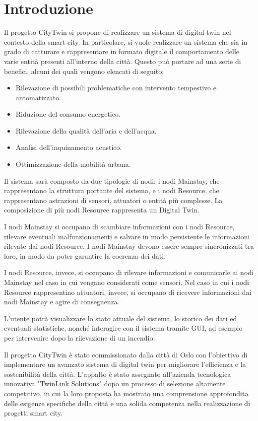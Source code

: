 \chapter{Introduzione}
Il progetto CityTwin si propone di realizzare un sistema di digital twin nel contesto della smart city. In particolare, si vuole realizzare un sistema che sia in grado di catturare e rappresentare in formato digitale il comportamento delle varie entità presenti all'interno della città. Questo può portare ad una serie di benefici, alcuni dei quali vengono elencati di seguito:

\begin{itemize}
    \item Rilevazione di possibili problematiche con intervento tempestivo e automatizzato.
    \item Riduzione del consumo energetico.
    \item Rilevazione della qualità dell'aria e dell'acqua.
    \item Analisi dell'inquinamento acustico.
    \item Ottimizzazione della mobilità urbana.
\end{itemize}

Il sistema sarà composto da due tipologie di nodi: i nodi Mainstay, che rappresentano la struttura portante del sistema, e i nodi Resource, che rappresentano astrazioni di sensori, attuatori o entità più complesse. La composizione di più nodi Resource rappresenta un Digital Twin.

I nodi Mainstay si occupano di scambiare informazioni con i nodi Resource, rilevare eventuali malfunzionamenti e salvare in modo persistente le informazioni rilevate dai nodi Resource. I nodi Mainstay devono essere sempre sincronizzati tra loro, in modo da poter garantire la coerenza dei dati.

I nodi Resource, invece, si occupano di rilevare informazioni e comunicarle ai nodi Mainstay nel caso in cui vengano considerati come sensori. Nel caso in cui i nodi Resource rappresentino attuatori, invece, si occupano di ricevere informazioni dai nodi Mainstay e agire di conseguenza.

L'utente potrà visualizzare lo stato attuale del sistema, lo storico dei dati ed eventuali statistiche, nonché interagire con il sistema tramite GUI, ad esempio per intervenire dopo la rilevazione di un incendio.

Il progetto CityTwin è stato commissionato dalla città di Oslo con l'obiettivo di implementare un avanzato sistema di digital twin per migliorare l'efficienza e la sostenibilità della città. L'appalto è stato assegnato all'azienda tecnologica innovativa "TwinLink Solutions" dopo un processo di selezione altamente competitivo, in cui la loro proposta ha mostrato una comprensione approfondita delle esigenze specifiche della città e una solida competenza nella realizzazione di progetti smart city.

